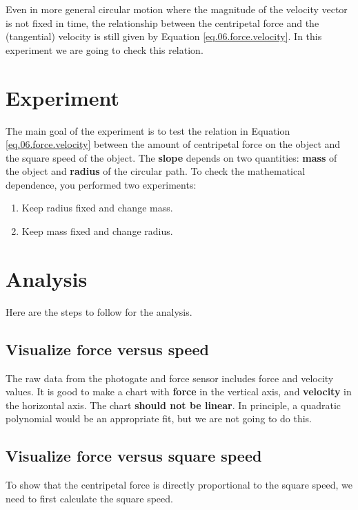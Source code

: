 Even in more general circular motion where the magnitude of the velocity vector is not fixed in time, the relationship between the centripetal force and the (tangential) velocity is still given by Equation \ref{eq.06.force.velocity}. In this experiment we are going to check this relation.
%
\section{Experiment}
%
The main goal of the experiment is to test the relation in Equation \ref{eq.06.force.velocity} between the amount of centripetal force on the object and the square speed of the object. The \textbf{slope} depends on two quantities: \textbf{mass} of the object and \textbf{radius} of the circular path. To check the mathematical dependence, you performed two experiments:
\begin{enumerate}
    \item Keep radius fixed and change mass.
    \item Keep mass fixed and change radius.
\end{enumerate}
%
\section{Analysis}
%
Here are the steps to follow for the analysis.
%
\subsection{Visualize force versus speed}
%
The raw data from the photogate and force sensor includes force and velocity values. It is good to make a chart with \textbf{force} in the vertical axis, and \textbf{velocity} in the horizontal axis. The chart \textbf{should not be linear}. In principle, a quadratic polynomial would be an appropriate fit, but we are not going to do this.
%
\subsection{Visualize force versus square speed}
%
To show that the centripetal force is directly proportional to the square speed, we need to first calculate the square speed.

